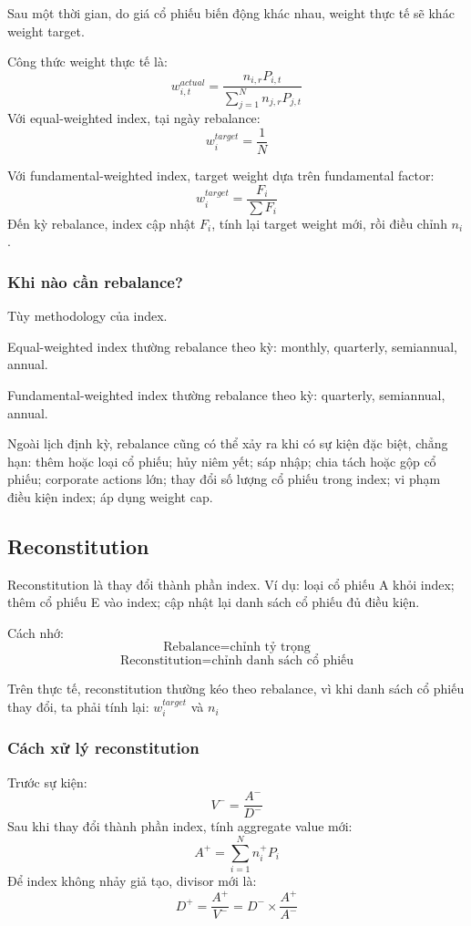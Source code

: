 Sau một thời gian, do giá cổ phiếu biến động khác nhau, weight thực tế sẽ khác weight target.

Công thức weight thực tế là:
\[
w_{i,t}^{actual}
=
\frac{n_{i,r}P_{i,t}}
{\sum_{j=1}^{N}n_{j,r}P_{j,t}}
\]
Với equal-weighted index, tại ngày rebalance:
\[
w_i^{target}
=
\frac{1}{N}
\]

Với fundamental-weighted index, target weight dựa trên fundamental factor:
\[
w_i^{target}
=
\frac{F_i}{\sum F_i}
\]
Đến kỳ rebalance, index cập nhật \(F_i\), tính lại target weight mới, rồi điều chỉnh \(n_i\).

\subsubsection{Khi nào cần rebalance?}
Tùy methodology của index.

Equal-weighted index thường rebalance theo kỳ:
monthly, quarterly, semiannual, annual.

Fundamental-weighted index thường rebalance theo kỳ:
quarterly, semiannual, annual.

Ngoài lịch định kỳ, rebalance cũng có thể xảy ra khi có sự kiện đặc biệt, chẳng hạn:
 thêm hoặc loại cổ phiếu;
 hủy niêm yết;
 sáp nhập;
 chia tách hoặc gộp cổ phiếu;
 corporate actions lớn;
 thay đổi số lượng cổ phiếu trong index;
 vi phạm điều kiện index;
 áp dụng weight cap.

\subsection{Reconstitution}
Reconstitution là thay đổi thành phần index.
Ví dụ:
 loại cổ phiếu A khỏi index;
 thêm cổ phiếu E vào index;
 cập nhật lại danh sách cổ phiếu đủ điều kiện.

Cách nhớ:
\[
\text{Rebalance} = \text{chỉnh tỷ trọng}
\]
\[
\text{Reconstitution} = \text{chỉnh danh sách cổ phiếu}
\]

Trên thực tế, reconstitution thường kéo theo rebalance, vì khi danh sách cổ phiếu thay đổi, ta phải tính lại:
$w_i^{target}$ và $n_i$

\subsubsection{Cách xử lý reconstitution}
Trước sự kiện:
\[
V^-
=
\frac{A^-}{D^-}
\]
Sau khi thay đổi thành phần index, tính aggregate value mới:
\[
A^+
=
\sum_{i=1}^{N}n_i^+P_i
\]
Để index không nhảy giả tạo, divisor mới là:
\[
D^+ = \frac{A^+}{V^-}
= D^- \times \frac{A^+}{A^-}
\]

